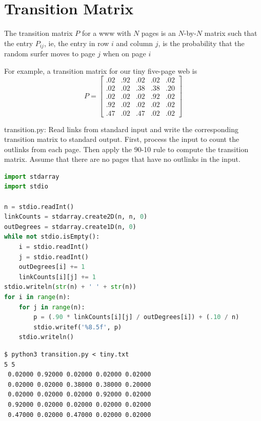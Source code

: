 \documentclass[8pt,a4paper,compress]{beamer}
\begin{document}
\section{Transition Matrix}
\begin{frame}[fragile]
\pause

The transition matrix $P$ for a www with $N$ pages is an $N$-by-$N$ matrix such that the entry $P_{ij}$, ie, the entry in row $i$ and column $j$, is the probability that the random surfer moves to page $j$ when on page $i$

\pause\bigskip

For example, a transition matrix for our tiny five-page web is
\[
P = \begin{bmatrix}
.02 & .92 & .02 & .02 & .02 \\
.02 & .02 & .38 & .38 & .20 \\
.02 & .02 & .02 & .92 & .02 \\
.92 & .02 & .02 & .02 & .02 \\
.47 & .02 & .47 & .02 & .02
\end{bmatrix}
\]
\end{frame}
\begin{frame}[fragile]
\pause

\begin{framed}
\tiny transition.py: Read links from standard input and write the corresponding transition matrix to standard output. First, process the input to count the outlinks from each page. Then apply the 90-10 rule to compute the transition matrix. Assume that there are no pages that have no outlinks in the input.
\end{framed}

\begin{lstlisting}[language=Python,style=focusin]
import stdarray
import stdio

n = stdio.readInt()
linkCounts = stdarray.create2D(n, n, 0)
outDegrees = stdarray.create1D(n, 0)
while not stdio.isEmpty():
    i = stdio.readInt()
    j = stdio.readInt()
    outDegrees[i] += 1
    linkCounts[i][j] += 1
stdio.writeln(str(n) + ' ' + str(n))
for i in range(n):
    for j in range(n):
        p = (.90 * linkCounts[i][j] / outDegrees[i]) + (.10 / n)
        stdio.writef('%8.5f', p)
    stdio.writeln()
\end{lstlisting}

\pause\bigskip

\begin{lstlisting}[language={},style=focusin]
$ python3 transition.py < tiny.txt
5 5
 0.02000 0.92000 0.02000 0.02000 0.02000
 0.02000 0.02000 0.38000 0.38000 0.20000
 0.02000 0.02000 0.02000 0.92000 0.02000
 0.92000 0.02000 0.02000 0.02000 0.02000
 0.47000 0.02000 0.47000 0.02000 0.02000
\end{lstlisting}
\end{frame}
\end{document}
